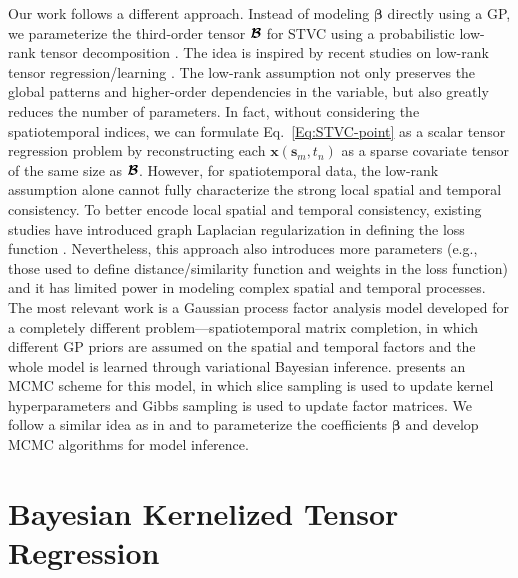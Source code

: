 \documentclass[12pt]{article}
\newcommand{\bd}[1]{\boldsymbol{#1}}
\begin{document}


Our work follows a different approach. Instead of modeling $\bd{\beta}$ directly using a GP, we parameterize the third-order tensor $\bd{\cal{B}}$ for STVC using a probabilistic low-rank tensor decomposition \citep{kolda2009tensor}. The idea is inspired by recent studies on low-rank tensor regression/learning \cite[see e.g.,][]{zhou2013tensor,bahadori2014fast,rabusseau2016low,yu2016learning,guhaniyogi2017bayesian,yu2018tensor}. The low-rank assumption not only preserves the global patterns and higher-order dependencies in the variable, but also greatly reduces the number of parameters. In fact, without considering the spatiotemporal indices, we can formulate Eq.~\eqref{Eq:STVC-point} as a scalar tensor regression problem \citep{guhaniyogi2017bayesian} by reconstructing each $\bd{x}(\bd{s}_m,t_n)$ as a sparse covariate tensor of the same size as $\bd{\cal{B}}$. However, for spatiotemporal data, the low-rank assumption alone cannot fully characterize the strong local spatial and temporal consistency. To better encode local spatial and temporal consistency, existing studies have introduced graph Laplacian regularization in defining the loss function \cite[e.g.,][]{bahadori2014fast,rao2015collaborative}. Nevertheless, this approach also introduces more parameters (e.g., those used to define distance/similarity function and weights in the loss function) and it has limited power in modeling complex spatial and temporal processes. The most relevant work is a Gaussian process factor analysis model \citep{luttinen2009variational} developed for a completely different problem---spatiotemporal matrix completion, in which different GP priors are assumed on the spatial and temporal factors and the whole model is learned through variational Bayesian inference. \citet{lei2022bayesian} presents an MCMC scheme for this model, in which slice sampling is used to update kernel hyperparameters and Gibbs sampling is used to update factor matrices. We follow a similar idea as in \citet{luttinen2009variational} and \citet{lei2022bayesian} to parameterize the coefficients $\bd{\beta}$ and develop MCMC algorithms for model inference.




\section{Bayesian Kernelized Tensor Regression}
\label{sec:meth}
\end{document}
